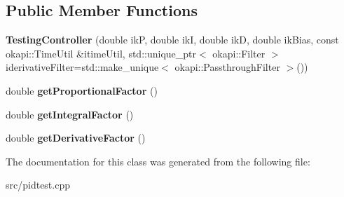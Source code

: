 \subsection*{Public Member Functions}
\begin{DoxyCompactItemize}
\item 
\mbox{\label{classTestingController_ab7cf58924cfe450061a9ac5967ff7a9f}} 
{\bfseries Testing\+Controller} (double ikP, double ikI, double ikD, double ik\+Bias, const okapi\+::\+Time\+Util \&itime\+Util, std\+::unique\+\_\+ptr$<$ okapi\+::\+Filter $>$ iderivative\+Filter=std\+::make\+\_\+unique$<$ okapi\+::\+Passthrough\+Filter $>$())
\item 
\mbox{\label{classTestingController_acc6c9b4e7cbb485861d41864664cce6c}} 
double {\bfseries get\+Proportional\+Factor} ()
\item 
\mbox{\label{classTestingController_a19a8ad24c637b49de618b8e0b4d07b8a}} 
double {\bfseries get\+Integral\+Factor} ()
\item 
\mbox{\label{classTestingController_ada0e8d63e79dce67df2bc7896a69fb12}} 
double {\bfseries get\+Derivative\+Factor} ()
\end{DoxyCompactItemize}


The documentation for this class was generated from the following file\+:\begin{DoxyCompactItemize}
\item 
src/pidtest.\+cpp\end{DoxyCompactItemize}
